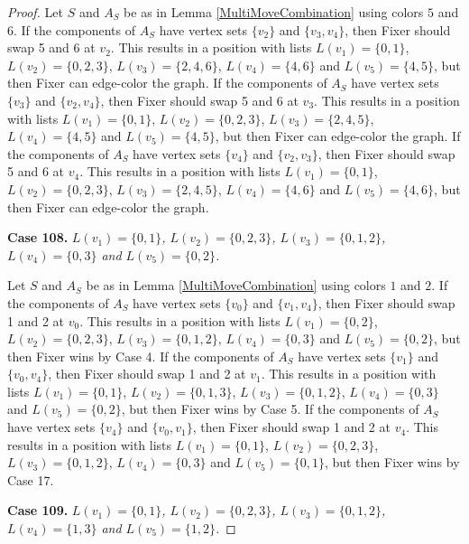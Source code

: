\documentclass[12pt]{amsart}
\theoremstyle{plain}
\theoremstyle{definition}
\theoremstyle{remark}
\begin{document}
\begin{proof}
Let $S$ and $A_S$ be as in Lemma \ref{MultiMoveCombination} using colors $5$ and $6$. If the components of $A_S$ have vertex sets $\{v_2\}$ and $\{v_3, v_4\}$, then Fixer should swap 5 and 6 at $v_2$. This results in a position with lists $L(v_1) = \{0, 1\}$, $L(v_2) = \{0, 2, 3\}$, $L(v_3) = \{2, 4, 6\}$, $L(v_4) = \{4, 6\}$ and $L(v_5) = \{4, 5\}$, but then Fixer can edge-color the graph.
If the components of $A_S$ have vertex sets $\{v_3\}$ and $\{v_2, v_4\}$, then Fixer should swap 5 and 6 at $v_3$. This results in a position with lists $L(v_1) = \{0, 1\}$, $L(v_2) = \{0, 2, 3\}$, $L(v_3) = \{2, 4, 5\}$, $L(v_4) = \{4, 5\}$ and $L(v_5) = \{4, 5\}$, but then Fixer can edge-color the graph.
If the components of $A_S$ have vertex sets $\{v_4\}$ and $\{v_2, v_3\}$, then Fixer should swap 5 and 6 at $v_4$. This results in a position with lists $L(v_1) = \{0, 1\}$, $L(v_2) = \{0, 2, 3\}$, $L(v_3) = \{2, 4, 5\}$, $L(v_4) = \{4, 6\}$ and $L(v_5) = \{4, 6\}$, but then Fixer can edge-color the graph.

\noindent\textbf{Case 108.  }\textit{$L(v_1) = \{0, 1\}$, $L(v_2) = \{0, 2, 3\}$, $L(v_3) = \{0, 1, 2\}$, $L(v_4) = \{0, 3\}$ and $L(v_5) = \{0, 2\}$.}

Let $S$ and $A_S$ be as in Lemma \ref{MultiMoveCombination} using colors $1$ and $2$. If the components of $A_S$ have vertex sets $\{v_0\}$ and $\{v_1, v_4\}$, then Fixer should swap 1 and 2 at $v_0$. This results in a position with lists $L(v_1) = \{0, 2\}$, $L(v_2) = \{0, 2, 3\}$, $L(v_3) = \{0, 1, 2\}$, $L(v_4) = \{0, 3\}$ and $L(v_5) = \{0, 2\}$, but then Fixer wins by Case 4.
If the components of $A_S$ have vertex sets $\{v_1\}$ and $\{v_0, v_4\}$, then Fixer should swap 1 and 2 at $v_1$. This results in a position with lists $L(v_1) = \{0, 1\}$, $L(v_2) = \{0, 1, 3\}$, $L(v_3) = \{0, 1, 2\}$, $L(v_4) = \{0, 3\}$ and $L(v_5) = \{0, 2\}$, but then Fixer wins by Case 5.
If the components of $A_S$ have vertex sets $\{v_4\}$ and $\{v_0, v_1\}$, then Fixer should swap 1 and 2 at $v_4$. This results in a position with lists $L(v_1) = \{0, 1\}$, $L(v_2) = \{0, 2, 3\}$, $L(v_3) = \{0, 1, 2\}$, $L(v_4) = \{0, 3\}$ and $L(v_5) = \{0, 1\}$, but then Fixer wins by Case 17.

\noindent\textbf{Case 109.  }\textit{$L(v_1) = \{0, 1\}$, $L(v_2) = \{0, 2, 3\}$, $L(v_3) = \{0, 1, 2\}$, $L(v_4) = \{1, 3\}$ and $L(v_5) = \{1, 2\}$.}


\end{proof}
\end{document}
